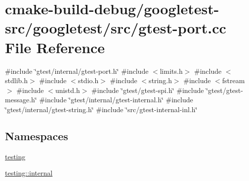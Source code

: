 \hypertarget{gtest-port_8cc}{}\section{cmake-\/build-\/debug/googletest-\/src/googletest/src/gtest-\/port.cc File Reference}
\label{gtest-port_8cc}
{\ttfamily \#include \char`\"{}gtest/internal/gtest-\/port.\+h\char`\"{}}\newline
{\ttfamily \#include $<$limits.\+h$>$}\newline
{\ttfamily \#include $<$stdlib.\+h$>$}\newline
{\ttfamily \#include $<$stdio.\+h$>$}\newline
{\ttfamily \#include $<$string.\+h$>$}\newline
{\ttfamily \#include $<$fstream$>$}\newline
{\ttfamily \#include $<$unistd.\+h$>$}\newline
{\ttfamily \#include \char`\"{}gtest/gtest-\/spi.\+h\char`\"{}}\newline
{\ttfamily \#include \char`\"{}gtest/gtest-\/message.\+h\char`\"{}}\newline
{\ttfamily \#include \char`\"{}gtest/internal/gtest-\/internal.\+h\char`\"{}}\newline
{\ttfamily \#include \char`\"{}gtest/internal/gtest-\/string.\+h\char`\"{}}\newline
{\ttfamily \#include \char`\"{}src/gtest-\/internal-\/inl.\+h\char`\"{}}\newline
\subsection*{Namespaces}
\begin{DoxyCompactItemize}
\item 
 \mbox{\hyperlink{namespacetesting}{testing}}
\item 
 \mbox{\hyperlink{namespacetesting_1_1internal}{testing\+::internal}}
\end{DoxyCompactItemize}
